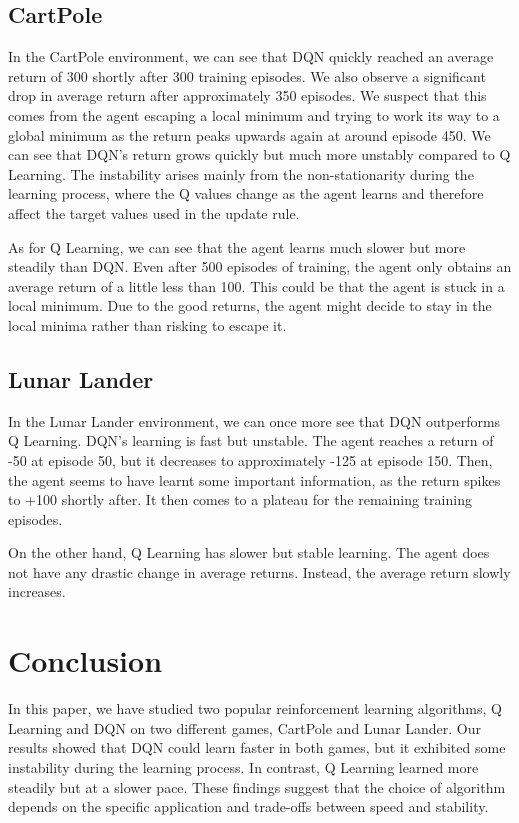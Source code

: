 \documentclass{article}
\begin{document}
\subsection{CartPole}
In the CartPole environment, we can see that DQN quickly reached an average
return of 300 shortly after 300 training episodes. We also observe a
significant drop in average return after approximately 350 episodes. We suspect
that this comes from the agent escaping a local minimum and trying to work its
way to a global minimum as the return peaks upwards again at around episode
450. We can see that DQN's return grows quickly but much more unstably compared
to Q Learning. The instability arises mainly from the non-stationarity during
the learning process, where the Q values change as the agent learns and
therefore affect the target values used in the update rule.

As for Q Learning, we can see that the agent learns much slower but more
steadily than DQN. Even after 500 episodes of training, the agent only obtains
an average return of a little less than 100. This could be that the agent is
stuck in a local minimum. Due to the good returns, the agent might decide to
stay in the local minima rather than risking to escape it.

\subsection{Lunar Lander}
In the Lunar Lander environment, we can once more see that DQN outperforms Q
Learning. DQN's learning is fast but unstable. The agent reaches a return of
-50 at episode 50, but it decreases to approximately -125 at episode 150. Then,
the agent seems to have learnt some important information, as the return spikes
to +100 shortly after. It then comes to a plateau for the remaining training
episodes.

On the other hand, Q Learning has slower but stable learning. The agent does
not have any drastic change in average returns. Instead, the average return
slowly increases.

\section{Conclusion}
In this paper, we have studied two popular reinforcement learning algorithms, Q
Learning and DQN on two different games, CartPole and Lunar Lander. Our results
showed that DQN could learn faster in both games, but it exhibited some
instability during the learning process. In contrast, Q Learning learned more
steadily but at a slower pace. These findings suggest that the choice of
algorithm depends on the specific application and trade-offs between speed and
stability.
\end{document}
